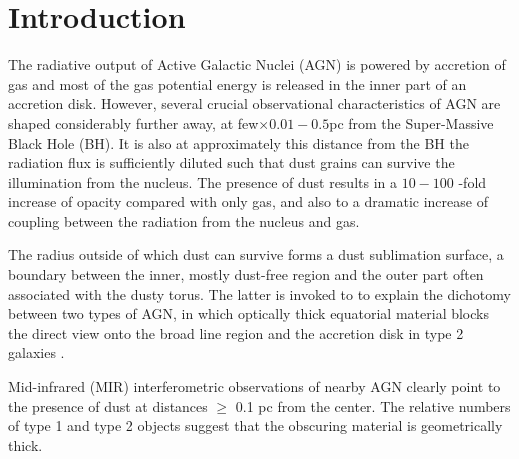 \documentclass[12pt,english,preprint]{aastex}
\begin{document}



\section{Introduction}

The radiative output of Active Galactic Nuclei (AGN) is powered
by accretion of gas and most of the gas potential energy is
released in the inner part of an accretion disk.  However, several crucial observational
characteristics of AGN are shaped considerably further away, at few$\times0.01-0.5$pc
from the Super-Massive Black Hole (BH).  It is also at approximately  this
distance from the BH the radiation flux is sufficiently diluted such
that dust grains can survive the illumination from the nucleus.
The presence of dust results in a $10-100$ -fold increase of opacity 
compared with only gas, and also to a  dramatic increase of coupling between the radiation
from the nucleus and gas.  

The radius outside of which dust can survive forms a dust sublimation
surface, a boundary between the inner, mostly
dust-free region and the outer part often associated with the dusty
torus.  The latter is
invoked to to explain the dichotomy between two types of AGN, in which 
optically thick equatorial material blocks the direct view onto the broad line region
and the accretion disk in type 2 galaxies
\citep{Rowan-Robinson77,Antonucci84,AntonucciMiller1985,UrryPadovani95}.

Mid-infrared (MIR) interferometric observations of nearby AGN 
clearly point to the presence of dust
\citep{Jaffe2004,Raban09,Tristram14,Tristram2011} 
at distances $\geq$ 0.1 pc from the center.  The relative numbers of type 
1 and type 2 objects suggest that the obscuring material is geometrically
thick.
\end{document}

